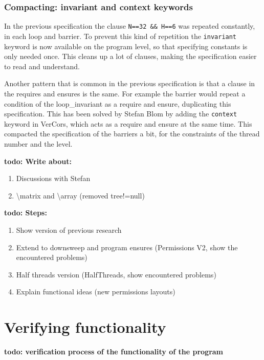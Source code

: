 \documentclass[a4paper]{article}
\newcommand{\todo}[1]{{\color{BurntOrange}\sffamily\textbf{todo: #1}\par}}
\newcommand{\code}[1]{\texttt{\small \color{inline}#1}} %
\begin{document}
\subsubsection{Compacting: invariant and context keywords}
In the previous specification the clause \code{N==32 \&\& H==6} was repeated constantly, in each loop and barrier. To prevent this kind of repetition the \code{invariant} keyword is now available on the program level, so that specifying constants is only needed once. This cleans up a lot of clauses, making the specification easier to read and understand.

Another pattern that is common in the previous specification is that a clause in the requires and ensures is the same. For example the barrier would repeat a condition of the loop\_invariant as a require and ensure, duplicating this specification. This has been solved by Stefan Blom by adding the \code{context} keyword in VerCors, which acts as a require and ensure at the same time. This compacted the specification of the barriers a bit, for the constraints of the thread number and the level.




\todo{Write about:}
\begin{enumerate}
	\item Discussions with Stefan
	\item \textbackslash matrix and \textbackslash array (removed tree!=null)
\end{enumerate}


\vspace{3cm}
\todo{Steps:}
\begin{enumerate}
	\item Show version of previous research
	\item Extend to downsweep and program ensures (Permissions V2, show the encountered problems)
	\item Half threads version (HalfThreads, show encountered problems)
	\item Explain functional ideas (new permissions layouts)
\end{enumerate}


\section{Verifying functionality}
\todo{verification process of the functionality of the program}
\end{document}
